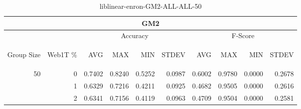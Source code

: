 \begin{center}
\begin{table}[htbp]
\begin{tabular}{ | r | r | r | r | r | r | r | r | r | r |}
\hline
\multicolumn{10}{|c|}{GM2}\\
\hline
 & & \multicolumn{4}{|c|}{Accuracy} & \multicolumn{4}{|c|}{F-Score}\\ \cline{3-10}
\begin{sideways}Group Size\end{sideways} & \begin{sideways}Web1T \%\end{sideways} & \begin{sideways}AVG\end{sideways} & \begin{sideways}MAX\end{sideways} & \begin{sideways}MIN\end{sideways} & \begin{sideways}STDEV\end{sideways} & \begin{sideways}AVG\end{sideways} & \begin{sideways}MAX\end{sideways} & \begin{sideways}MIN\end{sideways} & \begin{sideways}STDEV\end{sideways}\\
\hline
\multirow{2}{*}{50}
 & 0 & 0.7402 & 0.8240 & 0.5252 & 0.0987 & 0.6002 & 0.9780 & 0.0000 & 0.2678\\ \cline{2-10}
 & 1 & 0.6329 & 0.7216 & 0.4211 & 0.0925 & 0.4682 & 0.9505 & 0.0000 & 0.2616\\ \cline{2-10}
 & 2 & 0.6341 & 0.7156 & 0.4119 & 0.0963 & 0.4709 & 0.9504 & 0.0000 & 0.2581\\ \cline{2-10}
\hline
\end{tabular}
\caption{liblinear-enron-GM2-ALL-ALL-50}
\label{table:liblinear-enron-GM2-ALL-ALL-50}
\end{table}
\end{center}


